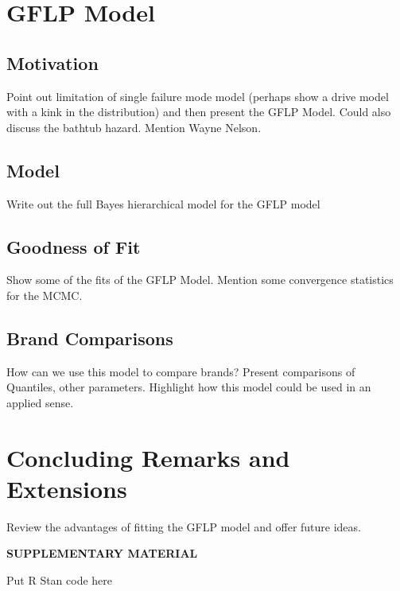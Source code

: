 \documentclass[12pt]{article}
\begin{document}
\section{GFLP Model}
\subsection{Motivation}
Point out limitation of single failure mode model (perhaps show a drive model with a kink in the distribution) and then present the GFLP Model.  Could also discuss the bathtub hazard.  Mention Wayne Nelson.
\subsection{Model}
Write out the full Bayes hierarchical model for the GFLP model
\subsection{Goodness of Fit}
Show some of the fits of the GFLP Model.  Mention some convergence statistics for the MCMC.  
\subsection{Brand Comparisons}
How can we use this model to compare brands?  Present comparisons of Quantiles, other parameters.  Highlight how this model could be used in an applied sense.  
\section{Concluding Remarks and Extensions}
Review the advantages of fitting the GFLP model and offer future ideas.  




    


\bigskip
\begin{center}
{\large\bf SUPPLEMENTARY MATERIAL}
\end{center}

\begin{description}

\item Put R Stan code here

\end{description}



\end{document}

